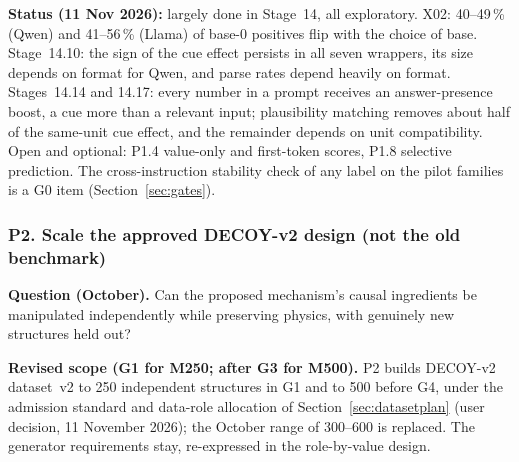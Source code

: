 \documentclass[10pt,a4paper]{article}
\begin{document}
\textbf{Status (11 Nov 2026):} largely done in Stage~14, all exploratory. X02: 40--49\,\% (Qwen) and 41--56\,\%
(Llama) of base-0 positives flip with the choice of base. Stage~14.10: the sign of the cue effect persists in all
seven wrappers, its size depends on format for Qwen, and parse rates depend heavily on format. Stages~14.14 and
14.17: every number in a prompt receives an answer-presence boost, a cue more than a relevant input; plausibility
matching removes about half of the same-unit cue effect, and the remainder depends on unit compatibility. Open
and optional: P1.4 value-only and first-token scores, P1.8 selective prediction. The cross-instruction stability
check of any label on the pilot families is a G0 item (Section~\ref{sec:gates}).

\subsubsection{P2. Scale the approved DECOY-v2 design (not the old benchmark)}
\label{sec:blockP2}

\textbf{Question (October).} Can the proposed mechanism's causal ingredients be manipulated independently while
preserving physics, with genuinely new structures held out?

\textbf{Revised scope (G1 for M250; after G3 for M500).} P2 builds DECOY-v2 dataset~v2 to 250 independent
structures in G1 and to 500 before G4, under the admission standard and data-role allocation of
Section~\ref{sec:datasetplan} (user decision, 11 November 2026); the October range of 300--600 is replaced. The
generator requirements stay, re-expressed in the role-by-value design.
\end{document}
